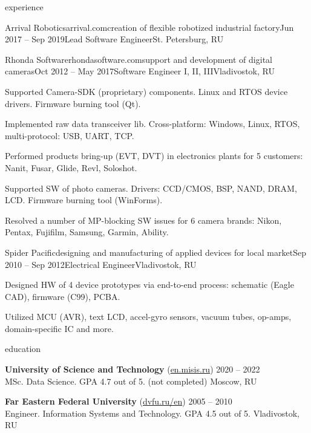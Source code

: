 \documentclass{Vladimir.Ivanov.CV}
\begin{document}
\begin{rSection}{experience}
\begin{rCompany}{Arrival Robotics}{arrival.com}{creation of flexible robotized industrial factory}{Jun 2017 -- Sep 2019}{Lead Software Engineer}{St. Petersburg, RU}
\end{rCompany}
\begin{rCompany}{Rhonda Software}{rhondasoftware.com}{support and development of digital cameras}{Oct 2012 -- May 2017}{Software Engineer I, II, III}{Vladivostok, RU}

\item Supported Camera-SDK (proprietary) components. Linux and RTOS device drivers. Firmware burning tool (Qt).
\item Implemented raw data transceiver lib. Cross-platform: Windows, Linux, RTOS, multi-protocol: USB, UART, TCP.
\item Performed products bring-up (EVT, DVT) in electronics plants for 5 customers: Nanit, Fusar, Glide, Revl, Soloshot.
\item Supported SW of photo cameras. Drivers: CCD/CMOS, BSP, NAND, DRAM, LCD. Firmware burning tool (WinForms).
\item Resolved a number of MP-blocking SW issues for 6 camera brands: Nikon, Pentax, Fujifilm, Samsung, Garmin, Ability.

\end{rCompany}
\begin{rCompany}{Spider Pacific}{}{designing and manufacturing of applied devices for local market}{Sep 2010 -- Sep 2012}{Electrical Engineer}{Vladivostok, RU}

\item Designed HW of 4 device prototypes via end-to-end process: schematic (Eagle CAD), firmware (C99), PCBA.
\item Utilized MCU (AVR), text LCD, accel-gyro sensors, vacuum tubes, op-amps, domain-specific IC and more.

\end{rCompany}
\end{rSection}

\begin{rSection}{education}

{\bf University of Science and Technology } {(\href{https://en.misis.ru}{en.misis.ru})} \hfill {2020 -- 2022} \\
MSc. Data Science. GPA 4.7 out of 5. (not completed) \hfill {Moscow, RU}

{\bf Far Eastern Federal University} {(\href{https://www.dvfu.ru/en}{dvfu.ru/en})} \hfill {2005 -- 2010} \\
Engineer. Information Systems and Technology. GPA 4.5 out of 5. \hfill {Vladivostok, RU}

\end{rSection}
\end{document}
